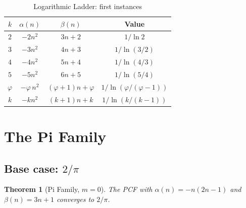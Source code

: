 \documentclass[11pt,a4paper]{article}
\theoremstyle{plain}
\newtheorem{theorem}{Theorem}[section]
\theoremstyle{definition}
\theoremstyle{remark}
\begin{document}
\begin{table}[ht]
\centering
\caption{Logarithmic Ladder: first instances}\label{tab:log}
\begin{tabular}{@{}cccc@{}}
\toprule
$k$ & $\alpha(n)$ & $\beta(n)$ & Value \\
\midrule
$2$ & $-2n^2$ & $3n+2$ & $1/\ln 2$ \\
$3$ & $-3n^2$ & $4n+3$ & $1/\ln(3/2)$ \\
$4$ & $-4n^2$ & $5n+4$ & $1/\ln(4/3)$ \\
$5$ & $-5n^2$ & $6n+5$ & $1/\ln(5/4)$ \\
$\varphi$ & $-\varphi\, n^2$ & $(\varphi{+}1)n{+}\varphi$ &
  $1/\ln(\varphi/(\varphi{-}1))$ \\
$k$ & $-kn^2$ & $(k{+}1)n{+}k$ & $1/\ln(k/(k{-}1))$ \\
\bottomrule
\end{tabular}
\end{table}

\section{The Pi Family}\label{sec:pi}

\subsection{Base case: \texorpdfstring{$2/\pi$}{2/pi}}\label{sec:pi_base}

\begin{theorem}[Pi Family, $m=0$]\label{thm:pi0}
The PCF with $\alpha(n) = -n(2n{-}1)$ and $\beta(n) = 3n+1$
converges to $2/\pi$.
\end{theorem}
\end{document}
